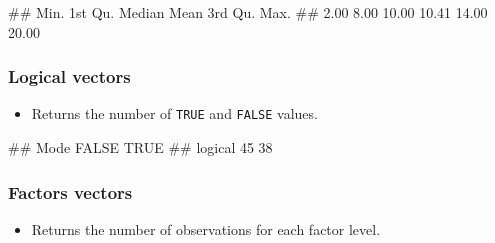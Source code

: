 \documentclass[
]{book}
\newenvironment{Shaded}{\begin{snugshade}}{\end{snugshade}}
\newcommand{\DecValTok}[1]{\textcolor[rgb]{0.00,0.00,0.81}{#1}}
\newcommand{\FunctionTok}[1]{\textcolor[rgb]{0.00,0.00,0.00}{#1}}
\newcommand{\NormalTok}[1]{#1}
\newcommand{\SpecialCharTok}[1]{\textcolor[rgb]{0.00,0.00,0.00}{#1}}
\providecommand{\tightlist}{%
  \setlength{\itemsep}{0pt}\setlength{\parskip}{0pt}}
\begin{document}
\begin{Shaded}
\begin{Highlighting}[]
\NormalTok{\#\#    Min. 1st Qu.  Median    Mean 3rd Qu.    Max. }
\NormalTok{\#\#    2.00    8.00   10.00   10.41   14.00   20.00}
\end{Highlighting}
\end{Shaded}

\hypertarget{logical-vectors}{%
\subsubsection{Logical vectors}\label{logical-vectors}}

\begin{itemize}
\tightlist
\item
  Returns the number of \texttt{TRUE} and \texttt{FALSE} values.
\end{itemize}

\begin{Shaded}
\end{Shaded}

\begin{Shaded}
\begin{Highlighting}[]
\NormalTok{\#\#    Mode   FALSE    TRUE }
\NormalTok{\#\# logical      45      38}
\end{Highlighting}
\end{Shaded}

\hypertarget{factors-vectors}{%
\subsubsection{Factors vectors}\label{factors-vectors}}

\begin{itemize}
\tightlist
\item
  Returns the number of observations for each factor level.
\end{itemize}

\begin{Shaded}
\end{Shaded}
\end{document}
